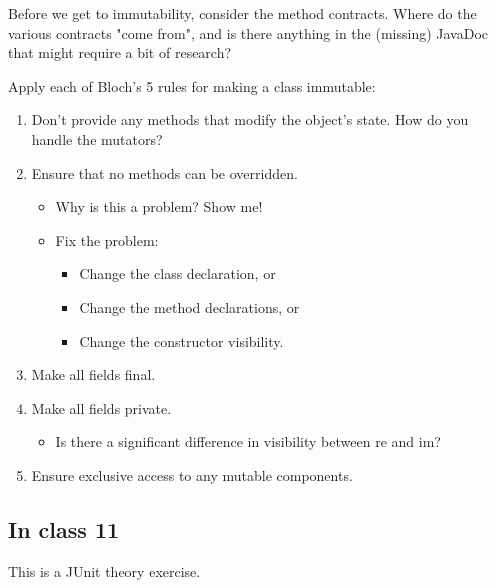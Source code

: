\documentclass[11pt]{article}
\begin{document}
Before we get to immutability, consider the method contracts. Where do the various contracts "come from", and is there anything in the (missing) JavaDoc that might require a bit of research?

Apply each of Bloch's 5 rules for making a class immutable:
\begin{enumerate}
\item Don't provide any methods that modify the object's state. How do you handle the mutators?
\item Ensure that no methods can be overridden.
\begin{itemize}
\item Why is this a problem? Show me!
\item Fix the problem:
\begin{itemize}
\item Change the class declaration, or
\item Change the method declarations, or
\item Change the constructor visibility.
\end{itemize}
\end{itemize}
\item Make all fields final.
\item Make all fields private.
\begin{itemize}
\item Is there a significant difference in visibility between re and im?
\end{itemize}
\item Ensure exclusive access to any mutable components.
\end{enumerate}

\subsection{In class 11}
\label{sec:org3711f95}
This is a JUnit theory exercise.
\end{document}
